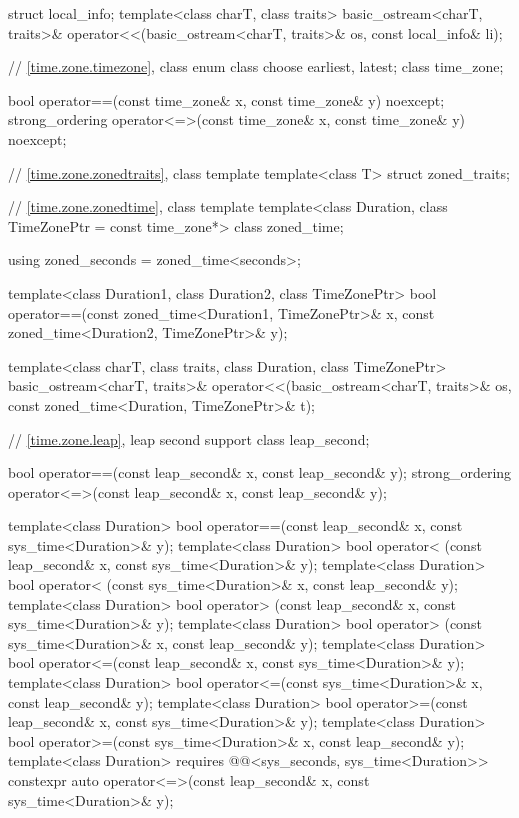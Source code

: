 \begin{codeblock}
{{    struct local_info;
    template<class charT, class traits>
      basic_ostream<charT, traits>&
        operator<<(basic_ostream<charT, traits>& os, const local_info& li);

    // \ref{time.zone.timezone}, class 
    enum class choose {earliest, latest};
    class time_zone;

    bool operator==(const time_zone& x, const time_zone& y) noexcept;
    strong_ordering operator<=>(const time_zone& x, const time_zone& y) noexcept;

    // \ref{time.zone.zonedtraits}, class template 
    template<class T> struct zoned_traits;

    // \ref{time.zone.zonedtime}, class template 
    template<class Duration, class TimeZonePtr = const time_zone*> class zoned_time;

    using zoned_seconds = zoned_time<seconds>;

    template<class Duration1, class Duration2, class TimeZonePtr>
      bool operator==(const zoned_time<Duration1, TimeZonePtr>& x,
                      const zoned_time<Duration2, TimeZonePtr>& y);

    template<class charT, class traits, class Duration, class TimeZonePtr>
      basic_ostream<charT, traits>&
        operator<<(basic_ostream<charT, traits>& os,
                   const zoned_time<Duration, TimeZonePtr>& t);

    // \ref{time.zone.leap}, leap second support
    class leap_second;

    bool operator==(const leap_second& x, const leap_second& y);
    strong_ordering operator<=>(const leap_second& x, const leap_second& y);

    template<class Duration>
      bool operator==(const leap_second& x, const sys_time<Duration>& y);
    template<class Duration>
      bool operator< (const leap_second& x, const sys_time<Duration>& y);
    template<class Duration>
      bool operator< (const sys_time<Duration>& x, const leap_second& y);
    template<class Duration>
      bool operator> (const leap_second& x, const sys_time<Duration>& y);
    template<class Duration>
      bool operator> (const sys_time<Duration>& x, const leap_second& y);
    template<class Duration>
      bool operator<=(const leap_second& x, const sys_time<Duration>& y);
    template<class Duration>
      bool operator<=(const sys_time<Duration>& x, const leap_second& y);
    template<class Duration>
      bool operator>=(const leap_second& x, const sys_time<Duration>& y);
    template<class Duration>
      bool operator>=(const sys_time<Duration>& x, const leap_second& y);
    template<class Duration>
      requires @@<sys_seconds, sys_time<Duration>>
      constexpr auto operator<=>(const leap_second& x, const sys_time<Duration>& y);

}}
\end{codeblock}
